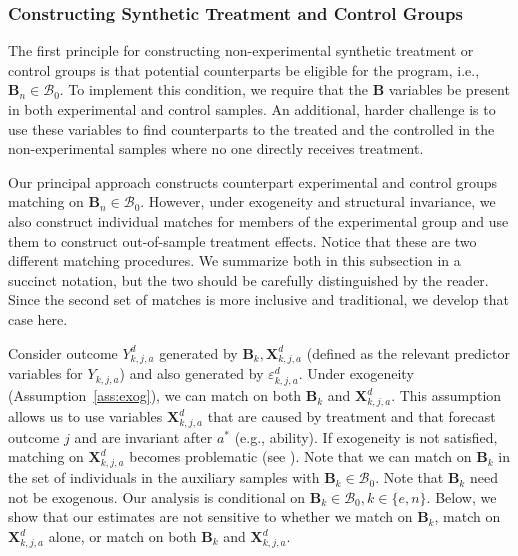 \subsubsection{Constructing Synthetic Treatment and Control Groups}\label{appendix:match}

\noindent The first principle for constructing non-experimental synthetic treatment or control groups is that potential counterparts be eligible for the program, i.e., $\bm{B}_n \in \mathcal{B}_{0}$. To implement this condition, we require that the $\bm{B}$ variables be present in both experimental and control samples. An additional, harder challenge is to use these variables to find counterparts to the treated and the controlled in the non-experimental samples where no one directly receives treatment.

\noindent Our principal approach constructs counterpart experimental and control groups matching on $\bm{B}_n \in \mathcal{B}_0$. However, under exogeneity and structural invariance, we also construct individual matches for members of the experimental group and use them to construct out-of-sample treatment effects. Notice that these are two different matching procedures. We summarize both in this subsection in a succinct notation, but the two should be carefully distinguished by the reader. Since the second set of matches is more inclusive and traditional, we develop that case here.

\noindent Consider outcome $Y^d_{k,j,a}$ generated by $\bm{B}_k, \bm{X}^d_{k,j,a}$ (defined as the relevant predictor variables for $Y_{k,j,a}$) and also generated by $\varepsilon^d_{k,j,a}$. Under exogeneity (Assumption~\ref{ass:exog}), we can match on both $\bm{B}_k$ and $\bm{X}^d_{k,j,a}$. This assumption allows us to  use variables $\bm{X}^d_{k,j,a}$ that are caused by treatment and that forecast outcome $j$ and are invariant after $a^\ast$ (e.g., ability). If exogeneity is not satisfied, matching on $\bm{X}^d_{k,j,a}$ becomes problematic (see \citealp{Heckman_Navarro_2004_REStat}). Note that we can match on $\bm{B}_k$ in the set of individuals in the auxiliary samples with $\bm{B}_k \in \mathcal{B}_{0}$. Note that $\bm{B}_k$ need not be exogenous. Our analysis is conditional on $\bm{B}_k \in \mathcal{B}_0, k \in \{e,n\}$. Below, we show that our estimates are not sensitive to whether we match on $\bm{B}_k$, match on $\bm{X}^d_{k,j,a}$ alone, or match on both $\bm{B}_k$ and $\bm{X}^d_{k,j,a}$.

